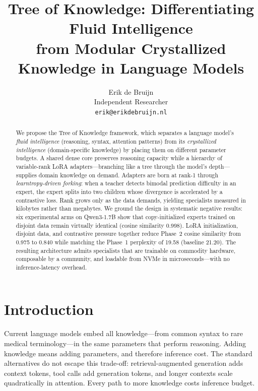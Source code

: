 \documentclass{article}
\title{Tree of Knowledge: Differentiating Fluid Intelligence \\ from Modular Crystallized Knowledge in Language Models}
\author{
  Erik de Bruijn \\
  Independent Researcher \\
  \texttt{erik@erikdebruijn.nl}
}
\newcommand{\tok}{Tree of Knowledge}
\begin{document}
\maketitle

\begin{abstract}
We propose the \tok{} framework, which separates a language model's
\emph{fluid intelligence} (reasoning, syntax, attention patterns) from its
\emph{crystallized intelligence} (domain-specific knowledge) by placing them on
different parameter budgets. A shared dense core preserves reasoning capacity
while a hierarchy of variable-rank LoRA adapters---branching like a tree through
the model's depth---supplies domain knowledge on demand. Adapters are born at
rank-1 through \emph{learntropy-driven forking}: when a teacher detects bimodal
prediction difficulty in an expert, the expert splits into two children whose
divergence is accelerated by a contrastive loss. Rank grows only as the data
demands, yielding specialists measured in kilobytes rather than megabytes. We
ground the design in systematic negative results: six experimental arms on
Qwen3-1.7B show that copy-initialized experts trained on disjoint data remain
virtually identical (cosine similarity 0.998). LoRA initialization, disjoint
data, and contrastive pressure together reduce Phase~2 cosine similarity from
0.975 to 0.840 while matching the Phase~1 perplexity of 19.58 (baseline
21.20). The resulting architecture admits specialists that are trainable on
commodity hardware, composable by a community, and loadable from NVMe in
microseconds---with no inference-latency overhead.
\end{abstract}

\section{Introduction}
\label{sec:intro}

Current language models embed all knowledge---from common syntax to rare medical terminology---in the same parameters that perform reasoning. Adding knowledge means adding parameters, and therefore inference cost. The standard alternatives do not escape this trade-off: retrieval-augmented generation adds context tokens, tool calls add generation tokens, and longer contexts scale quadratically in attention. Every path to more knowledge costs inference budget.
\end{document}
